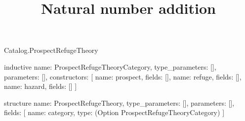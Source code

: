 \begin{lexlean}{Catalog.ProspectRefugeTheory}
\title{Natural number addition}
\begin{semanticmodule}
inductive{
  name: ProspectRefugeTheoryCategory,
  type_parameters: [],
  parameters: [],
  constructors: [
    {name: prospect, fields: []},
    {name: refuge, fields: []},
    {name: hazard, fields: []}
  ]
}

structure{
  name: ProspectRefugeTheory,
  type_parameters: [],
  parameters: [],
  fields: [
    {name: category, type: (Option ProspectRefugeTheoryCategory)}
  ]
}
\end{semanticmodule}
\end{lexlean}
